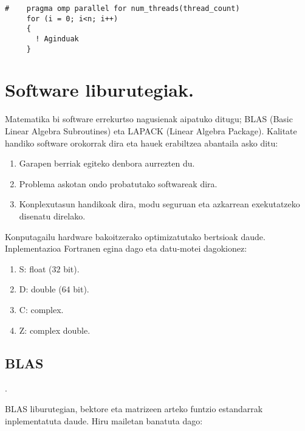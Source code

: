 \begin{lstlisting}
#    pragma omp parallel for num_threads(thread_count) 
     for (i = 0; i<n; i++)
     {
       ! Aginduak 
     }
\end{lstlisting}

\section{Software liburutegiak.}

Matematika bi software errekurtso nagusienak aipatuko ditugu; BLAS (Basic Linear Algebra Subroutines) eta LAPACK (Linear Algebra Package). Kalitate handiko software orokorrak dira eta hauek erabiltzea abantaila asko ditu: 

\begin{enumerate}
\item Garapen berriak egiteko denbora aurrezten du. 
\item Problema askotan ondo probatutako softwareak dira.
\item Konplexutasun handikoak dira, modu seguruan eta azkarrean exekutatzeko disenatu direlako. 
\end{enumerate}

Konputagailu hardware bakoitzerako optimizatutako bertsioak daude. Inplementazioa Fortranen egina dago eta datu-motei dagokionez:

\begin{enumerate}
\item S: float ($32$ bit).
\item D: double ($64$ bit).
\item C: complex.
\item Z: complex double.
\end{enumerate}   

\subsection*{\textbf{BLAS}}.

BLAS liburutegian, bektore eta matrizeen arteko funtzio estandarrak inplementatuta daude. Hiru mailetan banatuta dago: 

